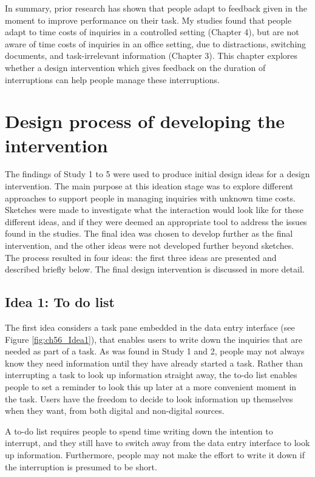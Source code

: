 In summary, prior research has shown that people adapt to feedback given in the moment to improve performance on their task. My studies found that people adapt to time costs of inquiries in a controlled setting (Chapter 4), but are not aware of time costs of inquiries in an office setting, due to distractions, switching documents, and task-irrelevant information (Chapter 3). This chapter explores whether a design intervention which gives feedback on the duration of interruptions can help people manage these interruptions.

\section{Design process of developing the intervention}
The findings of Study 1 to 5 were used to produce initial design ideas for a design intervention. The main purpose at this ideation stage was to explore different approaches to support people in managing inquiries with unknown time costs. Sketches were made to investigate what the interaction would look like for these different ideas, and if they were deemed an appropriate tool to address the issues found in the studies. The final idea was chosen to develop further as the final intervention, and the other ideas were not developed further beyond sketches. The process resulted in four ideas: the first three ideas are presented and described briefly below. The final design intervention is discussed in more detail. 

\subsection{Idea 1: To do list}
The first idea considers a task pane embedded in the data entry interface (see Figure \ref{fig:ch56_Idea1}), that enables users to write down the inquiries that are needed as part of a task. As was found in Study 1 and 2, people may not always know they need information until they have already started a task. Rather than interrupting a task to look up information straight away, the to-do list enables people to set a reminder to look this up later at a more convenient moment in the task. Users have the freedom to decide to look information up themselves when they want, from both digital and non-digital sources.

A to-do list requires people to spend time writing down the intention to interrupt, and they still have to switch away from the data entry interface to look up information. Furthermore, people may not make the effort to write it down if the interruption is presumed to be short. 

